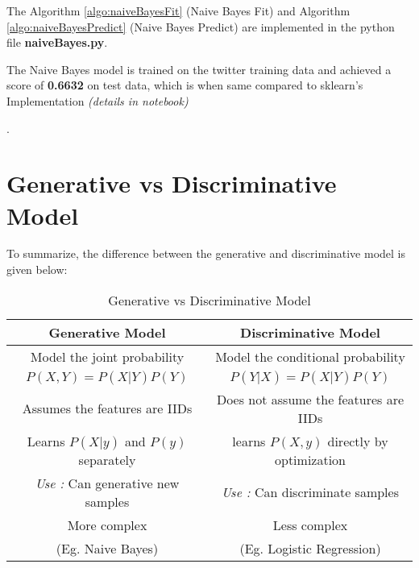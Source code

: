 {The Algorithm \ref{algo:naiveBayesFit} (Naive Bayes Fit) and Algorithm \ref{algo:naiveBayesPredict} (Naive Bayes Predict) are implemented in the python file {\bf naiveBayes.py}.

The Naive Bayes model is trained on the twitter training data and achieved a score of {\bf 0.6632} on test data, which is when same compared to sklearn's Implementation {\it (details in notebook) }}.


\section{Generative vs Discriminative Model}

To summarize, the difference between the generative and discriminative model is given below:

\begin{table}[h]
	\centering
	\begin{tabular}{|c|c|}
		\hline
		\textbf{Generative Model} & \textbf{Discriminative Model} \\
		\hline
		Model the joint probability & Model the conditional probability \\
		$P(X,Y) = P(X|Y)P(Y)$ & $P(Y|X) = P(X|Y)P(Y)$ \\
		\hline
		Assumes the features are IIDs & Does not assume the features are IIDs \\
		\hline
		Learns $P(X|y)$ and $P(y)$ separately & learns $P(X,y)$ directly by optimization \\
		\hline
		{\it Use : } Can generative new samples & {\it Use : } Can discriminate samples \\
		\hline
		More complex  & Less complex \\
		(Eg. Naive Bayes) & (Eg. Logistic Regression) \\
		\hline
	\end{tabular}
	\caption{Generative vs Discriminative Model}
\end{table}



